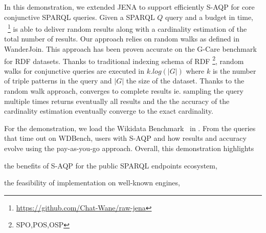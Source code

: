   In this demonstration, we extended JENA to support efficiently
  S-AQP for core conjunctive
  SPARQL queries.  Given a SPARQL $Q$ query and a budget in time,
  \NAME~\footnote{\url{https://github.com/Chat-Wane/raw-jena}} is able
  to deliver random results along with a cardinality estimation of the
  total number of results. Our approach relies on random
 walks as defined in WanderJoin\cite{li2016wanderjoin}. This approach
 has been proven accurate on the G-Care
 benchmark\cite{DBLP:conf/sigmod/ParkKBKHH20} for RDF datasets. Thanks
 to traditional indexing schema of RDF \footnote{SPO,POS,OSP}, random
 walks for conjunctive queries are executed in $k.log(|G|)$ where
 $k$ is the number of triple patterns in the query and $|G|$ the size
 of the dataset. Thanks to the random walk approach, \NAME converges
 to complete results ie. sampling the query multiple times returns
  eventually all results  and the  the accuracy of the cardinality
  estimation eventually converge to the exact cardinality.


\noindent For the demonstration, we load the Wikidata
Benchmark~\cite{angles2022wdbench} in \NAME. From the queries that
time out on WDBench, users  with S-AQP
and how results and accuracy evolve using the pay-as-you-go approach.
Overall, this demonstration highlights
\begin{inparaenum}[(i)]
\item the benefits of S-AQP for the public SPARQL endpoints ecosystem,
\item the feasibility of implementation on well-known engines,
\end{inparaenum}




